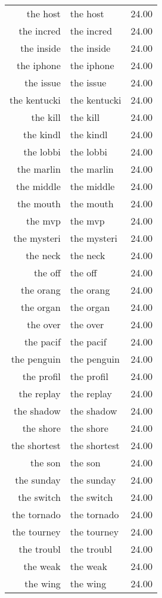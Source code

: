 \begin{table}[ht]
\begin{tabular}{rlr}
  the host & the host & 24.00 \\ 
  the incred & the incred & 24.00 \\ 
  the inside & the inside & 24.00 \\ 
  the iphone & the iphone & 24.00 \\ 
  the issue & the issue & 24.00 \\ 
  the kentucki & the kentucki & 24.00 \\ 
  the kill & the kill & 24.00 \\ 
  the kindl & the kindl & 24.00 \\ 
  the lobbi & the lobbi & 24.00 \\ 
  the marlin & the marlin & 24.00 \\ 
  the middle & the middle & 24.00 \\ 
  the mouth & the mouth & 24.00 \\ 
  the mvp & the mvp & 24.00 \\ 
  the mysteri & the mysteri & 24.00 \\ 
  the neck & the neck & 24.00 \\ 
  the off & the off & 24.00 \\ 
  the orang & the orang & 24.00 \\ 
  the organ & the organ & 24.00 \\ 
  the over & the over & 24.00 \\ 
  the pacif & the pacif & 24.00 \\ 
  the penguin & the penguin & 24.00 \\ 
  the profil & the profil & 24.00 \\ 
  the replay & the replay & 24.00 \\ 
  the shadow & the shadow & 24.00 \\ 
  the shore & the shore & 24.00 \\ 
  the shortest & the shortest & 24.00 \\ 
  the son & the son & 24.00 \\ 
  the sunday & the sunday & 24.00 \\ 
  the switch & the switch & 24.00 \\ 
  the tornado & the tornado & 24.00 \\ 
  the tourney & the tourney & 24.00 \\ 
  the troubl & the troubl & 24.00 \\ 
  the weak & the weak & 24.00 \\ 
  the wing & the wing & 24.00 \\ 

\end{tabular}
\end{table}
